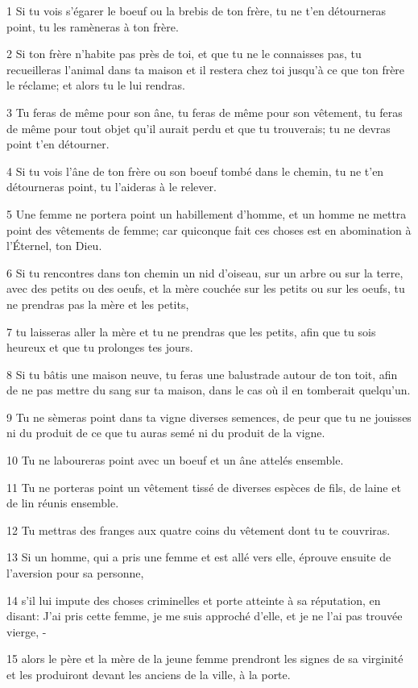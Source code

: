 \par 1 Si tu vois s'égarer le boeuf ou la brebis de ton frère, tu ne t'en détourneras point, tu les ramèneras à ton frère.
\par 2 Si ton frère n'habite pas près de toi, et que tu ne le connaisses pas, tu recueilleras l'animal dans ta maison et il restera chez toi jusqu'à ce que ton frère le réclame; et alors tu le lui rendras.
\par 3 Tu feras de même pour son âne, tu feras de même pour son vêtement, tu feras de même pour tout objet qu'il aurait perdu et que tu trouverais; tu ne devras point t'en détourner.
\par 4 Si tu vois l'âne de ton frère ou son boeuf tombé dans le chemin, tu ne t'en détourneras point, tu l'aideras à le relever.
\par 5 Une femme ne portera point un habillement d'homme, et un homme ne mettra point des vêtements de femme; car quiconque fait ces choses est en abomination à l'Éternel, ton Dieu.
\par 6 Si tu rencontres dans ton chemin un nid d'oiseau, sur un arbre ou sur la terre, avec des petits ou des oeufs, et la mère couchée sur les petits ou sur les oeufs, tu ne prendras pas la mère et les petits,
\par 7 tu laisseras aller la mère et tu ne prendras que les petits, afin que tu sois heureux et que tu prolonges tes jours.
\par 8 Si tu bâtis une maison neuve, tu feras une balustrade autour de ton toit, afin de ne pas mettre du sang sur ta maison, dans le cas où il en tomberait quelqu'un.
\par 9 Tu ne sèmeras point dans ta vigne diverses semences, de peur que tu ne jouisses ni du produit de ce que tu auras semé ni du produit de la vigne.
\par 10 Tu ne laboureras point avec un boeuf et un âne attelés ensemble.
\par 11 Tu ne porteras point un vêtement tissé de diverses espèces de fils, de laine et de lin réunis ensemble.
\par 12 Tu mettras des franges aux quatre coins du vêtement dont tu te couvriras.
\par 13 Si un homme, qui a pris une femme et est allé vers elle, éprouve ensuite de l'aversion pour sa personne,
\par 14 s'il lui impute des choses criminelles et porte atteinte à sa réputation, en disant: J'ai pris cette femme, je me suis approché d'elle, et je ne l'ai pas trouvée vierge, -
\par 15 alors le père et la mère de la jeune femme prendront les signes de sa virginité et les produiront devant les anciens de la ville, à la porte.

